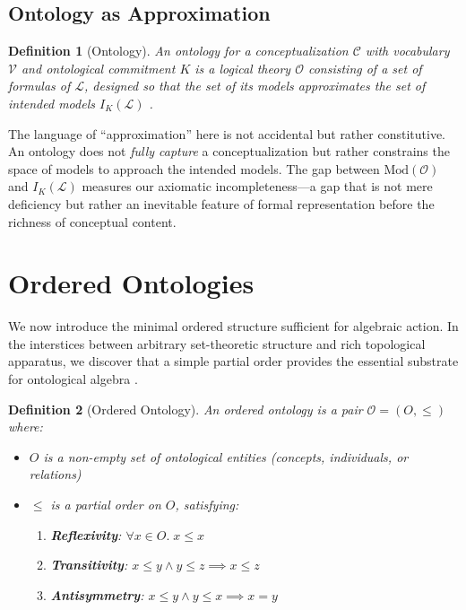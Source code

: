 \documentclass[12pt,a4paper]{article}
\newtheorem{definition}{Definition}[section]
\newcommand{\vocab}{\mathcal{V}}
\newcommand{\lang}{\mathcal{L}}
\newcommand{\concept}{\mathcal{C}}
\newcommand{\onto}{\mathcal{O}}
\begin{document}
\subsection{Ontology as Approximation}

\begin{definition}[Ontology]
An \emph{ontology} for a conceptualization $\concept$ with vocabulary $\vocab$ and ontological commitment $K$ is a logical theory $\onto$ consisting of a set of formulas of $\lang$, designed so that the set of its models approximates the set of intended models $I_K(\lang)$ \citep{gruber1993, guarino1998}.
\end{definition}

The language of ``approximation'' here is not accidental but rather constitutive. An ontology does not \emph{fully capture} a conceptualization but rather constrains the space of models to approach the intended models. The gap between $\text{Mod}(\onto)$ and $I_K(\lang)$ measures our axiomatic incompleteness---a gap that is not mere deficiency but rather an inevitable feature of formal representation before the richness of conceptual content.

\section{Ordered Ontologies}

We now introduce the minimal ordered structure sufficient for algebraic action. In the interstices between arbitrary set-theoretic structure and rich topological apparatus, we discover that a simple partial order provides the essential substrate for ontological algebra \citep[for foundational material on order theory, see][]{davey2002}.

\begin{definition}[Ordered Ontology]
An \emph{ordered ontology} is a pair $\onto = (O, \leq)$ where:
\begin{itemize}
    \item $O$ is a non-empty set of \emph{ontological entities} (concepts, individuals, or relations)
    \item $\leq$ is a partial order on $O$, satisfying:
    \begin{enumerate}[label=(\alph*)]
        \item \textbf{Reflexivity}: $\forall x \in O.\; x \leq x$
        \item \textbf{Transitivity}: $x \leq y \land y \leq z \implies x \leq z$
        \item \textbf{Antisymmetry}: $x \leq y \land y \leq x \implies x = y$
    \end{enumerate}
\end{itemize}
\end{definition}
\end{document}

